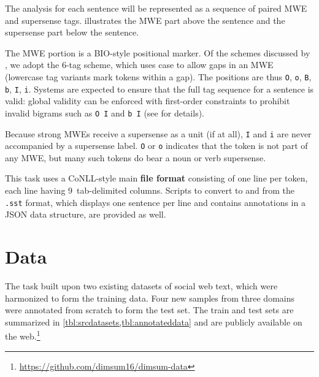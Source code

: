 \documentclass[11pt,letterpaper]{article}
\newcommand{\longversion}[1]{#1} %
\begin{document}
The analysis for each sentence will be represented as 
a sequence of paired MWE and supersense tags.  illustrates 
the MWE part above the sentence and the supersense part below the sentence.

The MWE portion is a BIO-style \citep{ramshaw-95} 
positional marker. Of the schemes discussed by \citet{schneider-14}, 
we adopt the 6-tag scheme, which uses case to allow gaps in an MWE (lowercase tag variants mark 
tokens within a gap).
The positions are thus \texttt{O}, \texttt{o}, \texttt{B}, \texttt{b},
\texttt{I}, \texttt{i}.
Systems are expected to ensure that the full tag sequence for a sentence is valid: 
global validity can be enforced with first-order constraints 
to prohibit invalid bigrams such as \texttt{O~I} and \texttt{b~I} (see \citealp{schneider-14} for details).

Because strong MWEs receive a supersense as a unit (if at all), 
\texttt{I} and \texttt{i} are never accompanied by a supersense label.
\texttt{O} or \texttt{o} indicates that the token is not part of any MWE, 
but many such tokens do bear a noun or verb supersense.

This task uses a CoNLL-style main \textbf{file format}
consisting of one line per token, each line having 9~tab-delimited columns.
Scripts to convert to and from the \texttt{.sst} format, which displays one sentence per line 
and contains annotations in a JSON data structure, are provided as well.

\section{Data}\label{sec:data}

The task built upon two existing datasets of social web text, which were 
harmonized to form the training data. Four new samples from three domains 
were annotated from scratch to form the test set.
The train and test sets are summarized in \cref{tbl:srcdatasets,tbl:annotateddata} 
and are publicly available on the web.\footnote{\url{https://github.com/dimsum16/dimsum-data}}

\begin{table}\small\centering

\label{tbl:srcdatasets}
\end{table}

\begin{table}\small\centering

\label{tbl:annotateddata}
\end{table}
\end{document}
